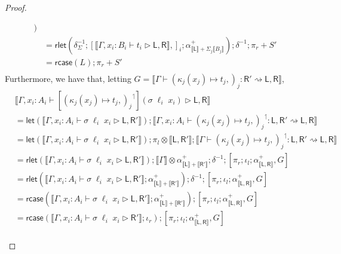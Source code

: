 \documentclass[acmsmall,screen,review]{acmart}
\newcommand{\ms}[1]{\ensuremath{\mathsf{#1}}}
\newcommand{\lupg}[1]{{#1}^\upharpoonleft}
\newcommand{\bhyp}[2]{#1 : #2}
\newcommand{\haslb}[3]{#1 \vdash #2 \rhd #3}
\newcommand{\lbsubst}[4]{#1 \vdash #2: #3 \rightsquigarrow #4}
\newcommand{\dnt}[1]{\llbracket{#1}\rrbracket}
\newcommand{\lmor}[1]{\ms{let}(#1)}
\newcommand{\rlmor}[1]{\ms{rlet}(#1)}
\newcommand{\rcase}[1]{\ms{rcase}(#1)}
\begin{document}
\begin{proof}
\begin{itemize}[leftmargin=*]
\begin{equation}
\begin{aligned}
          )
           \\
        & = \rlmor{
            \delta^{-1}_\Sigma
            ; [ \dnt{\haslb{\Gamma, \bhyp{x_i}{B_i}}{t_i}{\ms{L}, \ms{R}}},]_i
            ; \alpha^+_{\dnt{\ms{L}} + \Sigma_j\dnt{B_j}}}
          ; \delta^{-1} ; \pi_r + S'
          \\
        & = \rcase{L} ; \pi_r + S'
          \\
      \end{aligned}
    \end{equation}
    Furthermore, we have that, letting 
    $G = \dnt{\lbsubst{\Gamma}{(\kappa_j(x_j) \mapsto t_j,)_j}{\ms{R}'}{\ms{L}, \ms{R}}}$,
    \begin{equation}
      \begin{aligned}
        & \dnt{\haslb
          {\Gamma, \bhyp{x_i}{A_i}}{[\lupg{(\kappa_j(x_j) \mapsto t_j,)_j}](\sigma\;\ell_i\;x_i)}
          {\ms{L}, \ms{R}}} \\
        & = \lmor{\dnt{\haslb{\Gamma, \bhyp{x_i}{A_i}}{\sigma\;\ell_i\;x_i}{\ms{L}, \ms{R}'}}}
          ; \dnt{\lbsubst{\Gamma, \bhyp{x_i}{A_i}}{\lupg{(\kappa_j(x_j) \mapsto t_j,)_j}}
            {\ms{L}, \ms{R}'}{\ms{L}, \ms{R}}} \\
        & = \lmor{\dnt{\haslb{\Gamma, \bhyp{x_i}{A_i}}{\sigma\;\ell_i\;x_i}{\ms{L}, \ms{R}'}}}
          ; \pi_l \otimes \dnt{\ms{L}, \ms{R'}} 
          ; \dnt{\lbsubst{\Gamma}{\lupg{(\kappa_j(x_j) \mapsto t_j,)_j}}
            {\ms{L}, \ms{R}'}{\ms{L}, \ms{R}}} \\
        & = \rlmor{\dnt{\haslb{\Gamma, \bhyp{x_i}{A_i}}{\sigma\;\ell_i\;x_i}{\ms{L}, \ms{R}'}}}
        ; \dnt{\Gamma} \otimes \alpha^+_{\dnt{\ms{L}} + \dnt{\ms{R}'}}
        ; \delta^{-1}
        ; [\pi_r ; \iota_l ; \alpha^+_{\dnt{\ms{L}, \ms{R}}} , G]
         \\
        & = \rlmor{
          \dnt{\haslb{\Gamma, \bhyp{x_i}{A_i}}{\sigma\;\ell_i\;x_i}{\ms{L}, \ms{R}'}}
          ; \alpha^+_{\dnt{\ms{L}} + \dnt{\ms{R}'}}
        } ; \delta^{-1} 
        ; [\pi_r ; \iota_l ; \alpha^+_{\dnt{\ms{L}, \ms{R}}} , G] \\
        & = \rcase{
          \dnt{\haslb{\Gamma, \bhyp{x_i}{A_i}}{\sigma\;\ell_i\;x_i}{\ms{L}, \ms{R}'}}
          ; \alpha^+_{\dnt{\ms{L}} + \dnt{\ms{R}'}}
        }
        ; [\pi_r ; \iota_l ; \alpha^+_{\dnt{\ms{L}, \ms{R}}} , G] \\
        & = \rcase{
          \dnt{\haslb{\Gamma, \bhyp{x_i}{A_i}}{\sigma\;\ell_i\;x_i}{\ms{R}'}}
          ; \iota_r
        }
        ; [\pi_r ; \iota_l ; \alpha^+_{\dnt{\ms{L}, \ms{R}}} , G] \\

\end{aligned}
\end{equation}
\end{itemize}
\end{proof}
\end{document}
